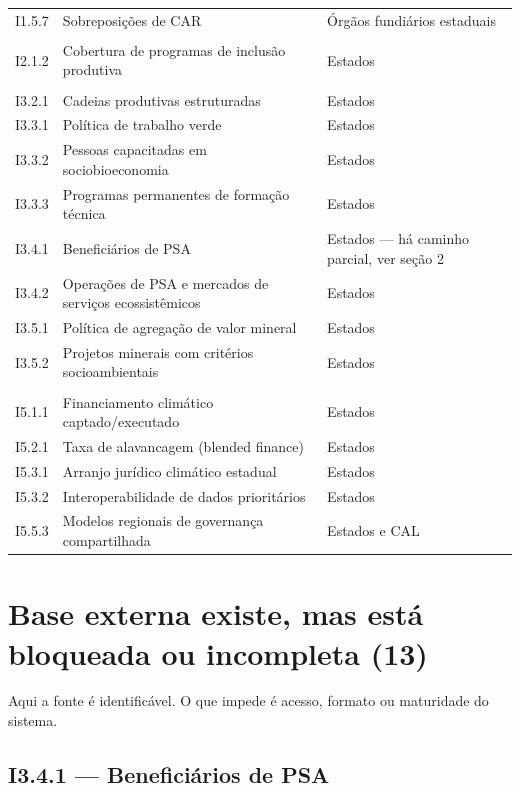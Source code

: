 \documentclass[11pt,a4paper]{article}
\begin{document}
\begin{longtable}{L{1.5cm} L{7.1cm} L{5.9cm}}
I1.5.7 & Sobreposições de CAR & Órgãos fundiários estaduais \\
\addlinespace
{} \\[0.3em]
I2.1.2 & Cobertura de programas de inclusão produtiva & Estados \\
\addlinespace
{} \\[0.3em]
I3.2.1 & Cadeias produtivas estruturadas & Estados \\
I3.3.1 & Política de trabalho verde & Estados \\
I3.3.2 & Pessoas capacitadas em sociobioeconomia & Estados \\
I3.3.3 & Programas permanentes de formação técnica & Estados \\
I3.4.1 & Beneficiários de PSA & Estados --- há caminho parcial, ver seção 2 \\
I3.4.2 & Operações de PSA e mercados de serviços ecossistêmicos & Estados \\
I3.5.1 & Política de agregação de valor mineral & Estados \\
I3.5.2 & Projetos minerais com critérios socioambientais & Estados \\
\addlinespace
{} \\[0.3em]
I5.1.1 & Financiamento climático captado/executado & Estados \\
I5.2.1 & Taxa de alavancagem (blended finance) & Estados \\
I5.3.1 & Arranjo jurídico climático estadual & Estados \\
I5.3.2 & Interoperabilidade de dados prioritários & Estados \\
I5.5.3 & Modelos regionais de governança compartilhada & Estados e CAL \\
\end{longtable}

\section{Base externa existe, mas está bloqueada ou incompleta (13)}

Aqui a fonte é identificável. O que impede é acesso, formato ou maturidade do sistema.

\subsection*{I3.4.1 --- Beneficiários de PSA}
\end{document}
